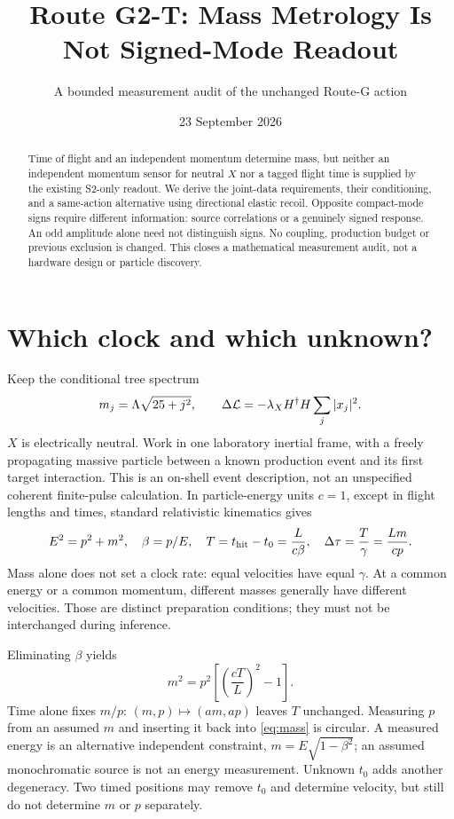 \documentclass[11pt,a4paper]{article}
\title{Route G2-T: Mass Metrology Is Not Signed-Mode Readout}
\author{A bounded measurement audit of the unchanged Route-G action}
\date{23 September 2026}
\begin{document}
\maketitle
\begin{abstract}
Time of flight and an independent momentum determine mass, but neither
an independent momentum sensor for neutral $X$ nor a tagged flight time
is supplied by the existing S2-only readout. We derive the joint-data
requirements, their conditioning, and a same-action alternative using
directional elastic recoil. Opposite compact-mode signs require different
information: source correlations or a genuinely signed response.
An odd amplitude alone need not distinguish signs. No coupling,
production budget or previous exclusion is changed. This closes a
mathematical measurement audit, not a hardware design or particle discovery.
\end{abstract}

\section{Which clock and which unknown?}
Keep the conditional tree spectrum
\begin{equation}
 m_j=\Lambda\sqrt{25+j^2},\qquad
 \Delta{\cal L}=-\lambda_X H^\dagger H\sum_j|x_j|^2.
\end{equation}
$X$ is electrically neutral. Work in one laboratory inertial frame,
with a freely propagating massive particle between a known production
event and its first target interaction. This is an on-shell event
description, not an unspecified coherent finite-pulse calculation.
In particle-energy units $c=1$, except in flight lengths and times,
standard relativistic kinematics gives \cite{pdgkin}
\begin{equation}
 E^2=p^2+m^2,\quad \beta=p/E,\quad
 T=t_{\rm hit}-t_0=\frac{L}{c\beta},\quad
 \Delta\tau=\frac{T}{\gamma}=\frac{Lm}{cp}.
\end{equation}
Mass alone does not set a clock rate: equal velocities have equal
$\gamma$. At a common energy or a common momentum, different masses
generally have different velocities. Those are distinct preparation
conditions; they must not be interchanged during inference.

Eliminating $\beta$ yields
\begin{equation}\label{eq:mass}
 \boxed{m^2=p^2\left[\left(\frac{cT}{L}\right)^2-1\right].}
\end{equation}
Time alone fixes $m/p$: $(m,p)\mapsto (am,ap)$ leaves $T$ unchanged.
Measuring $p$ from an assumed $m$ and inserting it back into
\eqref{eq:mass} is circular. A measured energy is an alternative
independent constraint, $m=E\sqrt{1-\beta^2}$; an assumed monochromatic
source is not an energy measurement. Unknown $t_0$ adds another
degeneracy. Two timed positions may remove $t_0$ and determine velocity,
but still do not determine $m$ or $p$ separately.
\end{document}
